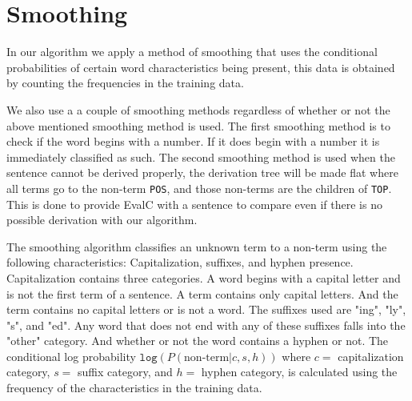 \documentclass[11pt,twocolumn]{article}
\begin{document}
\section{Smoothing}
In our algorithm we apply a method of smoothing that uses the conditional probabilities of certain word characteristics being present, this data is obtained by counting the frequencies in the training data.

We also use a a couple of smoothing methods regardless of whether or not the above mentioned smoothing method is used. The first smoothing method is to check if the word begins with a number. If it does begin with a number it is immediately classified as such. The second smoothing method is used when the sentence cannot be derived properly, the derivation tree will be made flat where all terms go to the non-term \texttt{POS}, and those non-terms are the children of \texttt{TOP}. This is done to provide EvalC with a sentence to compare even if there is no possible derivation with our algorithm.

The smoothing algorithm classifies an unknown term to a non-term using the following characteristics: Capitalization, suffixes, and hyphen presence. 
Capitalization contains three categories. A word begins with a capital letter and is not the first term of a sentence. A term contains only capital letters. And the term contains no capital letters or is not a word.
The suffixes used are "ing", "ly", "s", and "ed". Any word that does not end with any of these suffixes falls into the "other" category.
And whether or not the word contains a hyphen or not.
The conditional log probability $\texttt{log}(P (\text{non-term} | c, s, h))$ where $c=$ capitalization category, $s=$ suffix category, and $h=$ hyphen category, is calculated using the frequency of the characteristics in the training data.

\end{document}
